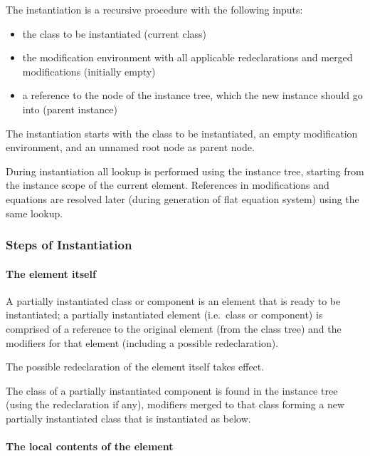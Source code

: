 The instantiation is a recursive procedure with the following inputs:
\begin{itemize}
\item
  the class to be instantiated (current class)
\item
  the modification environment with all applicable redeclarations and
  merged modifications (initially empty)
\item
  a reference to the node of the instance tree, which the new instance
  should go into (parent instance)
\end{itemize}

The instantiation starts with the class to be instantiated, an empty
modification environment, and an unnamed root node as parent node.

During instantiation all lookup is performed using the instance tree,
starting from the instance scope of the current element. References in
modifications and equations are resolved later (during generation of
flat equation system) using the same lookup.

\subsubsection{Steps of Instantiation}\label{steps-of-instantiation}

\paragraph*{The element itself}\label{the-element-itself}

A partially instantiated class or component is an element that is ready
to be instantiated; a partially instantiated element (i.e.\ class or
component) is comprised of a reference to the original element (from the
class tree) and the modifiers for that element (including a possible
redeclaration).

The possible redeclaration of the element itself takes effect.

The class of a partially instantiated component is found in the instance
tree (using the redeclaration if any), modifiers merged to that class
forming a new partially instantiated class that is instantiated as
below.

\paragraph*{The local contents of the element}\label{the-local-contents-of-the-element}

